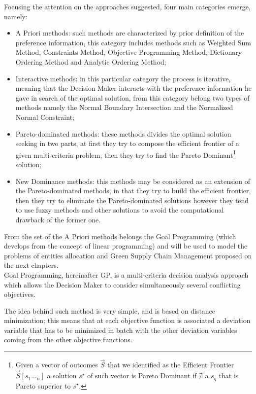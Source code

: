 \begin{doublespace}
Focusing the attention on the approaches suggested, four main categories emerge, namely:

\begin{itemize}
	\item A Priori methods: such methods are characterized by prior definition of the preference information, this category includes methods such as Weighted Sum Method, Constraints Method, Objective Programming Method, Dictionary Ordering Method and Analytic Ordering Method;   
	\item Interactive methods: in this particular category the process is iterative, meaning that the Decision Maker interacts with the preference information he gave in search of the optimal solution, from this category belong two types of methods namely the Normal Boundary Intersection and the Normalized Normal Constraint;
	\item Pareto-dominated methods: these methods divides the optimal solution seeking in two parts, at first they try to compose the efficient frontier of a given multi-criteria problem, then they try to find the Pareto Dominant\footnote{Given a vector of outcomes $\vec{S}$ that we identified as the Efficient Frontier $\vec{S}[s_1..._n]$ a solution $s^{\star}$ of such vector is Pareto Dominant if $\nexists$ a $s_q$ that is Pareto superior to $s^{\star}$.} solution;
	\item New Dominance methods: this methods may be considered as an extension of the Pareto-dominated methods, in that they try to build the efficient frontier, then they try to eliminate the Pareto-dominated solutions however they tend to use fuzzy methods and other solutions to avoid the computational drawback of the former one.  
\end{itemize}

From the set of the A Priori methods belongs the Goal Programming (which develops from the concept of linear programming) and will be used to model the problems of entities allocation and Green Supply Chain Management proposed on the next chapters.
\\
Goal Programming, hereinafter GP, is a multi-criteria decision analysis approach which allows the Decision Maker to consider simultaneously several conflicting objectives.

The idea behind such method is very simple, and is based on distance minimization; this means that at each objective function is associated a deviation variable that has to be minimized in batch with the other deviation variables coming from the other objective functions.


\end{doublespace}

